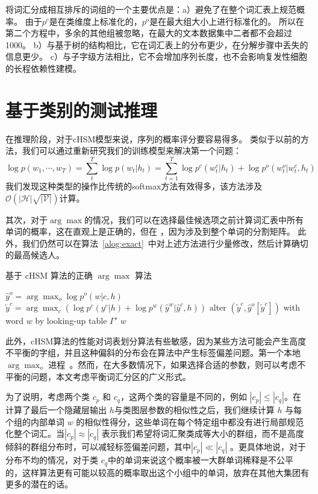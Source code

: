 将词汇分成相互排斥的词组的一个主要优点是：a）避免了在整个词汇表上规范概率。 由于$ p ^ c $是在类维度上标准化的，$ p ^ o $是在最大组大小上进行标准化的。 所以在第二个方程中，多余的其他组被忽略，在最大的文本数据集中二者都不会超过1000。 b）与基于树的结构相比，它在词汇表上的分布更少，在分解步骤中丢失的信息更少。 c）与子字级方法相比，它不会增加序列长度，也不会影响复发性细胞的长程依赖性建模。



\section{基于类别的测试推理}
在推理阶段，对于cHSM模型来说，序列的概率评分要容易得多。
类似于以前的方法，我们可以通过重新研究我们的训练模型来解决第一个问题：
\begin{equation}\label{equ:class_inf}
   \log p(w_1,\cdots, w_T)=\sum_t^T\log p(w_t|h_t)=\sum_{t=1}^{T}\log p^c(w^c_t|h_t) +\log p^o(w^o_t|w^c_t,h_t)
\end{equation}
我们发现这种类型的操作比传统的softmax方法有效得多，该方法涉及$ \mathcal{O (| H | \sqrt{|V|} )}$计算。

其次，对于$\arg\max $的情况，我们可以在选择最佳候选项之前计算词汇表中所有单词的概率，这在直观上是正确的，但在
，因为涉及到整个单词的分割矩阵。 此外，我们仍然可以在算法~\ref{alog:exact}~中对上述方法进行少量修改，然后计算确切的最高候选人。
\begin{algorithm}[!ht]
\caption{基于 cHSM 算法的正确 $\arg\max$ 算法}\label{alog:exact}
 $\hat y^o=\arg\max_o{\log p^o(w| c,h)}$ 
 $\tilde y^c=\arg\max_c{(\log p^c(y^c|h)+\log p^w(\hat y^w|\hat y^c,h))}$
 alter $(\tilde y^c,\hat y^o[\tilde y^c])$ with word $w$ by looking-up table $\Gamma'$ \;
 \Return $w$ \;
\end{algorithm}

此外，cHSM算法的性能对词表划分算法有些敏感，因为某些方法可能会产生高度不平衡的字组，并且这种偏斜的分布会在算法中产生标签偏差问题。第一个本地 $\arg\max_o$ 进程~。然而，在大多数情况下，如果选择合适的参数，则可以考虑不平衡的问题，本文考虑平衡词汇分区的广义形式。

为了说明，考虑两个类 $ c_p $ 和 $ c_q $，这两个类的容量是不同的，例如 $| c_p | \le | c_q |$。在计算了最后一个隐藏层输出 $h$与类图层参数的相似性之后，我们继续计算 $h$ 与每个组的内部单词 $w$ 的相似性得分，这些单词在每个特定组中都没有进行局部规范化整个词汇。当$ | c_p | \approx|c_q|$ 表示我们希望将词汇聚类成等大小的群组，而不是高度倾斜的群组分布时，可以减轻标签偏差问题，其中$ | c_p | \ll | c_q | $ 。更具体地说，对于分布不均的情况，对于类 $ c_q $中的单词来说这个概率被一大群单词稀释是不公平的，这样算法更有可能以较高的概率取出这个小组中的单词，放弃在其他大集团有更多的潜在的话。

